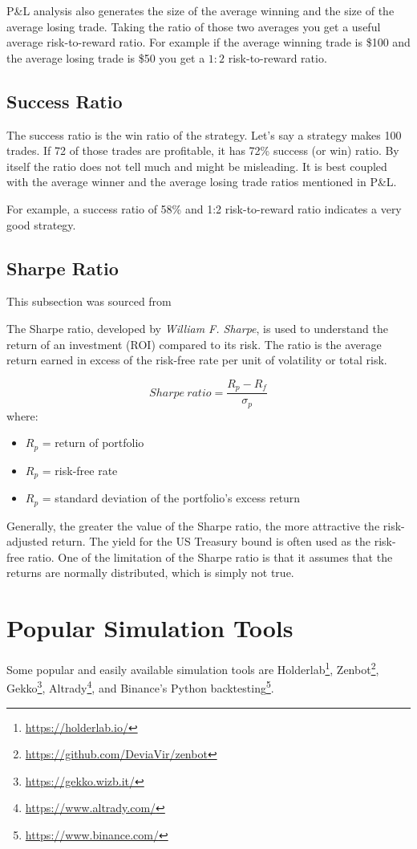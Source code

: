 P\&L analysis also generates the size of the average winning and the size of the average losing trade. Taking the ratio of those two averages you get a useful average risk-to-reward ratio. For example if the average winning trade is \$100 and the average losing trade is \$50 you get a $1:2$ risk-to-reward ratio.

\subsection*{Success Ratio}
The success ratio is the win ratio of the strategy. Let's say a strategy makes 100 trades. If 72 of those trades are profitable, it has 72\% success (or win) ratio. By itself the ratio does not tell much and might be misleading. It is best coupled with the average winner and the average losing trade ratios mentioned in P\&L.

For example, a success ratio of 58\% and 1:2 risk-to-reward ratio indicates a very good strategy.

\subsection*{Sharpe Ratio}
This subsection was sourced from~\cite{investopedia:sharpe-ratio}

The Sharpe ratio, developed by \emph{William F. Sharpe}, is used to understand the return of an investment (ROI) compared to its risk. The ratio is the average return earned in excess of the risk-free rate per unit of volatility or total risk.

$$Sharpe\ ratio = \frac{R_p - R_f}{\sigma _p}$$
where:
\begin{itemize}
    \item $R_p$ = return of portfolio
    \item $R_p$ = risk-free rate
    \item $R_p$ = standard deviation of the portfolio's excess return
\end{itemize}

Generally, the greater the value of the Sharpe ratio, the more attractive the risk-adjusted return. The yield for the US Treasury bound is often used as the risk-free ratio. One of the limitation of the Sharpe ratio is that it assumes that the returns are normally distributed, which is simply not true.

\section{Popular Simulation Tools}
Some popular and easily available simulation tools are Holderlab\footnote{\url{https://holderlab.io/}}, Zenbot\footnote{\url{https://github.com/DeviaVir/zenbot}}, Gekko\footnote{\url{https://gekko.wizb.it/}}, Altrady\footnote{\url{https://www.altrady.com/}}, and Binance's Python backtesting\footnote{\url{https://www.binance.com/}}.

